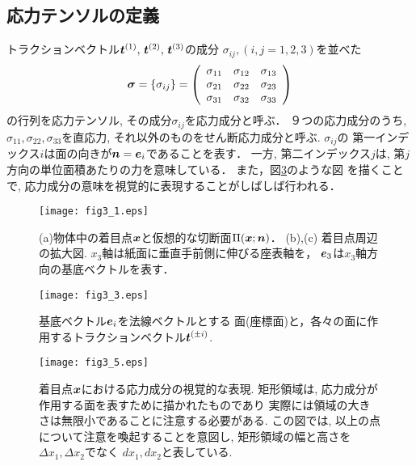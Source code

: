\documentclass[10pt,a4j]{jarticle}
\begin{document}
\subsection{応力テンソルの定義}
トラクションベクトル$\mbox{\boldmath $t$}^{(1)},\, \mbox{\boldmath $t$}^{(2)},\,\mbox{\boldmath $t$}^{(3)}$の成分
$\sigma_{ij},(i,j=1,2,3)$を並べた
\begin{equation}
	\mbox{\boldmath $\sigma$}=\left\{ \sigma_{ij}\right\}
	=\left(
	\begin{array}{ccc}
		\sigma_{11} & \sigma_{12} & \sigma_{13} \\
		\sigma_{21} & \sigma_{22} & \sigma_{23} \\
		\sigma_{31} & \sigma_{32} & \sigma_{33} 
	\end{array}
	\right)
\end{equation}
の行列を応力テンソル, その成分$\sigma_{ij}$を応力成分と呼ぶ．
９つの応力成分のうち, $\sigma_{11},\sigma_{22},\sigma_{33}$を直応力, 
それ以外のものをせん断応力成分と呼ぶ. $\sigma_{ij}$の
第一インデックス$i$は面の向きが$\mbox{\boldmath $n$}=\mbox{\boldmath $e$}_i$であることを表す．
一方, 第二インデックス$j$は, 第$j$方向の単位面積あたりの力を意味している．
また，図\ref{fig:fig3_5}のような図
を描くことで, 応力成分の意味を視覚的に表現することがしばしば行われる．
\begin{figure}[h]
	\begin{center}
	\texttt{[image: fig3\_1.eps]} 
	\end{center}
	\caption{(a)物体中の着目点$\mbox{\boldmath $x$}$と仮想的な切断面$\Pi(\mbox{\boldmath $x$};\mbox{\boldmath $n$})$．
	(b),(c) 着目点周辺の拡大図.
	$x_3$軸は紙面に垂直手前側に伸びる座表軸を，
	$\mbox{\boldmath $e$}_3$は$x_3$軸方向の基底ベクトルを表す．} 
	\label{fig:fig3_1}
\end{figure}
\begin{figure}[h]
	\begin{center}
	\texttt{[image: fig3\_3.eps]} 
	\end{center}
	\caption{基底ベクトル$\mbox{\boldmath $e$}_i$を法線ベクトルとする
	面(座標面)と，各々の面に作用するトラクションベクトル$\mbox{\boldmath $t$}^{(\pm i)}$.}
	\label{fig:fig3_3}
\end{figure}
\begin{figure}[h]
	\begin{center}
	\texttt{[image: fig3\_5.eps]} 
	\end{center}
	\caption{着目点$\mbox{\boldmath $x$}$における応力成分の視覚的な表現.
	矩形領域は, 応力成分が作用する面を表すために描かれたものであり
	実際には領域の大きさは無限小であることに注意する必要がある.
	この図では, 以上の点について注意を喚起することを意図し, 
	矩形領域の幅と高さを$\Delta x_1, \Delta x_2$でなく
	$dx_1, dx_2$と表している. }
	\label{fig:fig3_5}
\end{figure}
\end{document}
